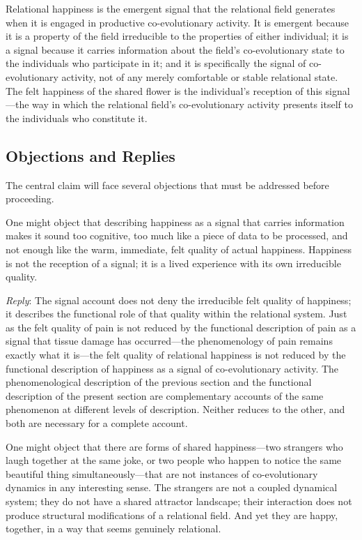 \begin{claim}
Relational happiness is the emergent signal that the relational field generates when it is engaged in productive co-evolutionary activity. It is emergent because it is a property of the field irreducible to the properties of either individual; it is a signal because it carries information about the field's co-evolutionary state to the individuals who participate in it; and it is specifically the signal of co-evolutionary activity, not of any merely comfortable or stable relational state. The felt happiness of the shared flower is the individual's reception of this signal---the way in which the relational field's co-evolutionary activity presents itself to the individuals who constitute it.
\end{claim}

\subsection{Objections and Replies}
\label{p14:subsec:objections}

\noindent
The central claim will face several objections that must be addressed before proceeding.

 One might object that describing happiness as a signal that carries information makes it sound too cognitive, too much like a piece of data to be processed, and not enough like the warm, immediate, felt quality of actual happiness. Happiness is not the reception of a signal; it is a lived experience with its own irreducible quality.

\emph{Reply}: The signal account does not deny the irreducible felt quality of happiness; it describes the functional role of that quality within the relational system. Just as the felt quality of pain is not reduced by the functional description of pain as a signal that tissue damage has occurred---the phenomenology of pain remains exactly what it is---the felt quality of relational happiness is not reduced by the functional description of happiness as a signal of co-evolutionary activity. The phenomenological description of the previous section and the functional description of the present section are complementary accounts of the same phenomenon at different levels of description. Neither reduces to the other, and both are necessary for a complete account.

 One might object that there are forms of shared happiness---two strangers who laugh together at the same joke, or two people who happen to notice the same beautiful thing simultaneously---that are not instances of co-evolutionary dynamics in any interesting sense. The strangers are not a coupled dynamical system; they do not have a shared attractor landscape; their interaction does not produce structural modifications of a relational field. And yet they are happy, together, in a way that seems genuinely relational.

